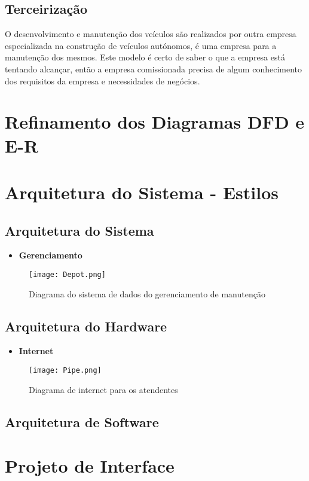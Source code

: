 \subsection{Terceirização}
O desenvolvimento e manutenção dos veículos são realizados por outra empresa especializada na construção de veículos autónomos, é uma empresa para a manutenção dos mesmos. Este modelo é certo de saber o que a empresa está tentando alcançar, então a empresa comissionada precisa de algum conhecimento dos requisitos da empresa e necessidades de negócios.



\section{Refinamento dos Diagramas DFD e E-R}


\section{Arquitetura do Sistema - Estilos}




\subsection{Arquitetura do Sistema}

\begin{itemize}

\item \textbf{Gerenciamento}
\end{itemize}
\begin{figure}[H]
          \begin{center}
              \caption{Diagrama do sistema de dados do gerenciamento de manutenção} \label{afp}
              \texttt{[image: Depot.png]} \\

          \end{center}
         \end{figure}





\subsection{Arquitetura do Hardware}


\begin{itemize}

\item \textbf{Internet}
\end{itemize}
\begin{figure}[H]
     \begin{center}
         \caption{Diagrama de internet para os atendentes} \label{afp}
         \texttt{[image: Pipe.png]} \\

     \end{center}
    \end{figure}




\subsection{Arquitetura de Software}


\section{Projeto de Interface}
